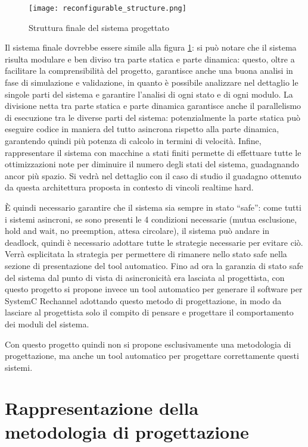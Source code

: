 \documentclass[a4paper,titlepage]{book}
\begin{document}
\begin{figure}[!ht]
\centering
\texttt{[image: reconfigurable\_structure.png]}
\caption{Struttura finale del sistema progettato}\label{fig:a}
\end{figure}

Il sistema finale dovrebbe essere simile alla figura \ref{fig:a}: si può notare che il sistema risulta modulare e ben diviso tra parte statica e parte dinamica: questo, oltre a facilitare la comprensibilità del progetto, garantisce anche una buona analisi in fase di simulazione e validazione, in quanto è possibile analizzare nel dettaglio le singole parti del sistema e garantire l'analisi di ogni stato e di ogni modulo.
La divisione netta tra parte statica e parte dinamica garantisce anche il parallelismo di esecuzione tra le diverse parti del sistema: potenzialmente la parte statica può eseguire codice in maniera del tutto asincrona rispetto alla parte dinamica, garantendo quindi più potenza di calcolo in termini di velocità. Infine, rappresentare il sistema con macchine a stati finiti permette di effettuare tutte le ottimizzazioni note per diminuire il numero degli stati del sistema, guadagnando ancor più spazio.
Si vedrà nel dettaglio con il caso di studio il guadagno ottenuto da questa architettura proposta in contesto di vincoli realtime hard.

È quindi necessario garantire che il sistema sia sempre in stato ``safe'': come tutti i sistemi asincroni, se sono presenti le 4 condizioni necessarie (mutua esclusione, hold and wait, no preemption, attesa circolare), il sistema può andare in deadlock, quindi è necessario adottare tutte le strategie necessarie per evitare ciò. Verrà esplicitata la strategia per permettere di rimanere nello stato safe nella sezione di presentazione del tool automatico.
Fino ad ora la garanzia di stato safe del sistema dal punto di vista di asincronicità era lasciata al progettista, con questo progetto si propone invece un tool automatico per generare il software per SystemC Rechannel adottando questo metodo di progettazione, in modo da lasciare al progettista solo il compito di pensare e progettare il comportamento dei moduli del sistema.

Con questo progetto quindi non si propone esclusivamente una metodologia di progettazione, ma anche un tool automatico per progettare correttamente questi sistemi.


\section{Rappresentazione della metodologia di progettazione}
\end{document}
